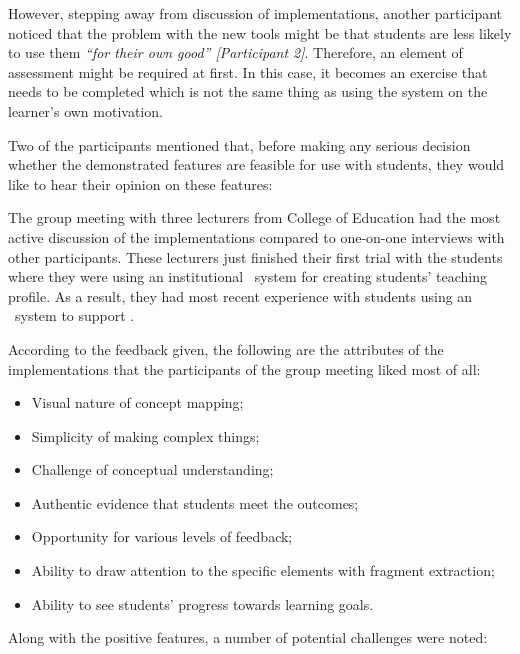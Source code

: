 However, stepping away from discussion of implementations, another participant
noticed that the problem with the new tools might be that students are less
likely to use them \textit{``for their own good'' [Participant 2]}. Therefore,
an element of assessment might be required at first. In this case, it becomes an
exercise that needs to be completed which is not the same thing as using
the system on the learner's own motivation.

Two of the participants mentioned that, before making any serious decision
whether the demonstrated features are feasible for use with students, they would
like to hear their opinion on these features:


The group meeting with three lecturers from College of Education had the most
active discussion of the implementations compared to one-on-one interviews
with other participants. These lecturers just finished their first trial with
the students where they were using an institutional \ep~system for creating
students' teaching profile. As a result, they had most recent experience with
students using an \ep~system to support \LLLsn.

According to the feedback given, the following are the attributes of the
implementations that the participants of the group meeting liked most of all:

\begin{itemize}
  \item Visual nature of concept mapping;
  \item Simplicity of making complex things;
  \item Challenge of conceptual understanding;
  \item Authentic evidence that students meet the outcomes;
  \item Opportunity for various levels of feedback;
  \item Ability to draw attention to the specific elements with fragment
  extraction;
  \item Ability to see students' progress towards learning goals.
\end{itemize}

Along with the positive features, a number of potential challenges were noted:

